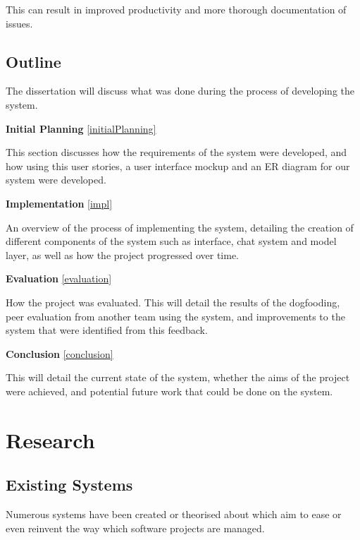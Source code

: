 \documentclass[a4paper]{l3proj}
\begin{document}
This can result in improved productivity and more thorough documentation of issues.

\section{Outline}
\label{outline}

The dissertation will discuss what was done during the process of developing the system.

\textbf{Initial Planning} \autoref{initialPlanning}

This section discusses how the requirements of the system were developed, and how using this user stories, a user interface mockup and an ER diagram for our system were developed.

\textbf{Implementation} \autoref{impl}

An overview of the process of implementing the system, detailing the creation of different components of the system such as interface, chat system and model layer, as well as how the project progressed over time.

\textbf{Evaluation} \autoref{evaluation}

How the project was evaluated.  This will detail the results of the dogfooding, peer evaluation from another team using the system, and improvements to the system that were identified from this feedback.

\textbf{Conclusion} \autoref{conclusion}

This will detail the current state of the system, whether the aims of the project were achieved, and potential future work that could be done on the system.


\chapter{Research}
\label{research}
\section{Existing Systems}
\label{existingSystems}

Numerous systems have been created or theorised about which aim to ease or even reinvent the way which software projects are managed.
\end{document}
